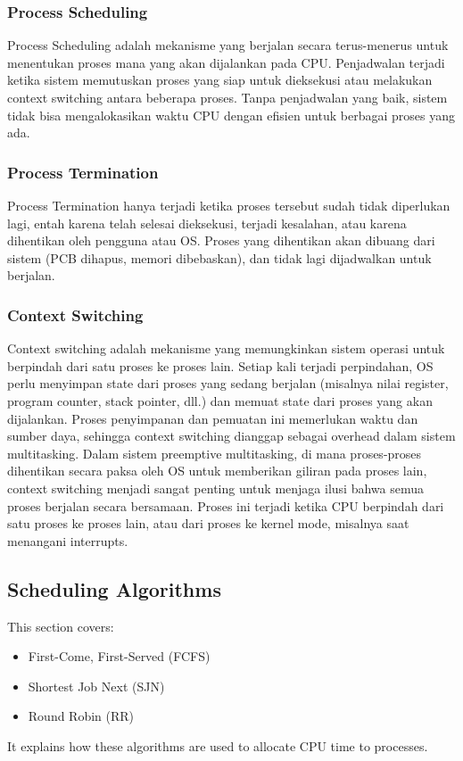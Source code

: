\documentclass[12pt]{article}
\begin{document}
\subsubsection{Process Scheduling}
Process Scheduling adalah mekanisme yang berjalan secara terus-menerus untuk menentukan proses mana yang akan dijalankan pada CPU. Penjadwalan terjadi ketika sistem memutuskan proses yang siap untuk dieksekusi atau melakukan context switching antara beberapa proses. Tanpa penjadwalan yang baik, sistem tidak bisa mengalokasikan waktu CPU dengan efisien untuk berbagai proses yang ada.

\subsubsection{Process Termination}
Process Termination hanya terjadi ketika proses tersebut sudah tidak diperlukan lagi, entah karena telah selesai dieksekusi, terjadi kesalahan, atau karena dihentikan oleh pengguna atau OS. Proses yang dihentikan akan dibuang dari sistem (PCB dihapus, memori dibebaskan), dan tidak lagi dijadwalkan untuk berjalan.

\subsubsection{Context Switching}
Context switching adalah mekanisme yang memungkinkan sistem operasi untuk berpindah dari satu proses ke proses lain. Setiap kali terjadi perpindahan, OS perlu menyimpan state dari proses yang sedang berjalan (misalnya nilai register, program counter, stack pointer, dll.) dan memuat state dari proses yang akan dijalankan. Proses penyimpanan dan pemuatan ini memerlukan waktu dan sumber daya, sehingga context switching dianggap sebagai overhead dalam sistem multitasking. Dalam sistem preemptive multitasking, di mana proses-proses dihentikan secara paksa oleh OS untuk memberikan giliran pada proses lain, context switching menjadi sangat penting untuk menjaga ilusi bahwa semua proses berjalan secara bersamaan. Proses ini terjadi ketika CPU berpindah dari satu proses ke proses lain, atau dari proses ke kernel mode, misalnya saat menangani interrupts.



\subsection{Scheduling Algorithms}
This section covers:
\begin{itemize}
    \item First-Come, First-Served (FCFS)
    \item Shortest Job Next (SJN)
    \item Round Robin (RR)
\end{itemize}
It explains how these algorithms are used to allocate CPU time to processes.
\end{document}
